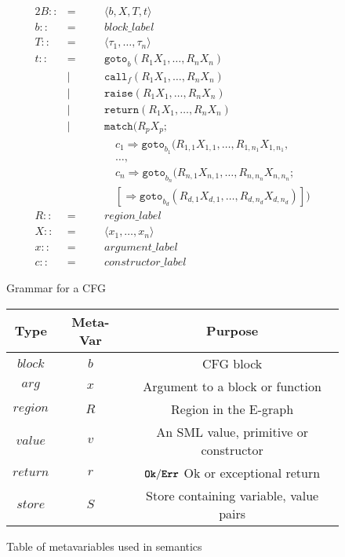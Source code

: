 \documentclass{article}
\newcommand{\bttt}[1]{\texttt{\textbf{#1}}}
\begin{document}
\begin{figure}[H]
  \centering
  \begin{alignat*}{2}
    B ::&=\quad&& \langle b, X, T, t \rangle \\
    b ::&=&& block\_label \\
    T ::&=&& \langle \tau_1, \dots, \tau_n \rangle \\
    t ::&=&& \texttt{goto}_b ( R_1 X_1, \dots, R_n X_n ) \\
        &|&& \texttt{call}_f ( R_1 X_1, \dots, R_n X_n ) \\
        &|&& \texttt{raise} ( R_1 X_1, \dots, R_n X_n ) \\
        &|&& \texttt{return} ( R_1 X_1, \dots, R_n X_n ) \\
        &|&& \texttt{match} ( R_p X_p; \\
        &&&\quad c_1 \Rightarrow \texttt{goto}_{b_1} (R_{1,1} X_{1,1}, \dots, R_{1,n_1} X_{1,n_1},\\
        &&&\quad \dots, \\
        &&&\quad c_n \Rightarrow \texttt{goto}_{b_n} (R_{n,1} X_{n,1}, \dots, R_{n,n_n} X_{n,n_n}; \\
        &&&\quad [\Rightarrow \texttt{goto}_{b_{d}} (R_{d,1} X_{d,1}, \dots, R_{d,n_d} X_{d,n_d})] ) \\
    R ::&=&& region\_label \\
    X ::&=&& \langle x_1, \dots, x_n \rangle \\
    x ::&=&& argument\_label \\
    c ::&=&& constructor\_label
  \end{alignat*}
  \caption{Grammar for a CFG}
  \label{fig:CFG_grammar}
\end{figure}

\begin{figure}[H]
  \centering
  \begin{tabular}{c|c|c}
    \textbf{Type} & \textbf{Meta-Var} & \textbf{Purpose} \\\hline
    $block$       & $b$               & CFG block \\\hline
    $arg$         & $x$               & Argument to a block or function \\\hline
    $region$      & $R$               & Region in the E-graph \\\hline
    $value$       & $v$               & An SML value, primitive or constructor \\\hline
    $return$      & $r$               & $\bttt{Ok}/\bttt{Err}$ Ok or exceptional return\\\hline
    $store$       & $S$               & Store containing variable, value pairs
  \end{tabular}
  \caption{Table of metavariables used in semantics}
  \label{fig:metavars}
\end{figure}
\end{document}

